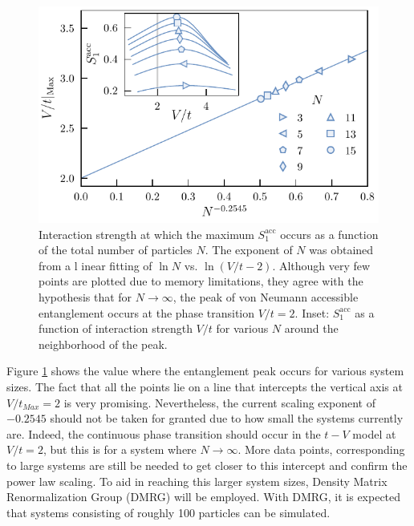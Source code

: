 	\begin{figure}[h!]
	\begin{center}
	\includegraphics[scale=1.0]{Images/peakScalingOddN.pdf}
	\end{center}
	\caption{Interaction strength at which the maximum $S_{1}^{\mathrm{acc}}$ occurs as a 	function of the total number of particles $N$. The exponent of $N$ was obtained from a l	inear fitting of $\ln N$ vs. $\ln{(V/t - 2)}$.  Although very few points are plotted due to 	memory limitations, they agree with the hypothesis that for $N \to \infty$, the peak of 	von Neumann accessible entanglement occurs at the phase transition $V/t = 2$. Inset: 	$S_{1}^{\mathrm{acc}}$ as a function of interaction strength $V/t$ for various $N$ 		around the neighborhood of the peak.}
	\label{fig:peakScalingOddN}
	\end{figure}
	
	Figure \ref{fig:peakScalingOddN} shows the value where the entanglement peak occurs for various system sizes. The fact that all the points lie on a line that intercepts the vertical axis at $V/t_{Max}=2$ is very promising. Nevertheless, the current scaling exponent of $-0.2545$ should not be taken for granted due to how small the systems currently are. Indeed, the continuous phase transition should occur in the $t-V$ model at $V/t=2$, but this is for a system where $N \to \infty$. More data points, corresponding to large systems are still be needed to get closer to this intercept and confirm the power law scaling. To aid in reaching this larger system sizes, Density Matrix Renormalization Group (DMRG) will be employed. With DMRG, it is expected that systems consisting of roughly 100 particles can be simulated.

